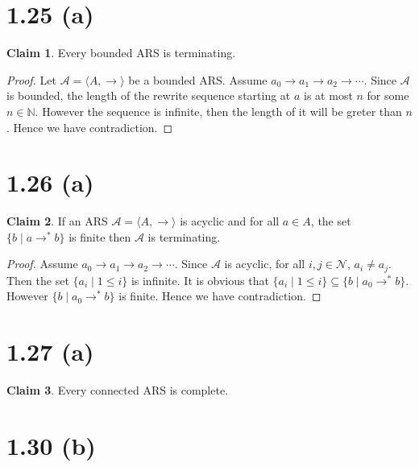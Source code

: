 \documentclass[autodetect-enginem]{article}
\title{}
\author{}
\date{}
\theoremstyle{plain}
\theoremstyle{definition}
\newtheorem*{claim*}{Claim}
\begin{document}
\section*{1.25 (a)}

\begin{claim*}
    Every bounded ARS is terminating.
\end{claim*}

\begin{proof}
    Let $\mathcal{A} = \langle A, \to \rangle$ be a bounded ARS.
    Assume $a_0 \to a_1 \to a_2 \to \cdots$.
    Since $\mathcal{A}$ is bounded, the length of the rewrite sequence starting at $a$ is at most $n$ for some $n \in \mathbb{N}$.
    However the sequence is infinite, then the length of it will be greter than $n$.
    Hence we have contradiction.    
\end{proof}

\section*{1.26 (a)}

\begin{claim*}
    If an ARS $\mathcal{A} = \langle A, \to \rangle$ is acyclic and for all $a\in A$, the set $\{b \mid a \to^* b\}$
    is finite then $\mathcal{A}$ is terminating.
\end{claim*}

\begin{proof}
    Assume $a_0 \to a_1 \to a_2 \to \cdots$.
    Since $\mathcal{A}$ is acyclic, for all $i,j \in \mathcal{N}$, $a_i \neq a_j$.
    Then the set $\{ a_i \mid 1 \leq i \}$ is infinite.
    It is obvious that $\{ a_i \mid 1 \leq i \} \subseteq \{b \mid a_0 \to^* b\}$.
    However $\{b \mid a_0 \to^* b\}$ is finite. Hence we have contradiction.
\end{proof}

\section*{1.27 (a)}

\begin{claim*}
    Every connected ARS is complete.
\end{claim*}


\section*{1.30 (b)}
\end{document}
